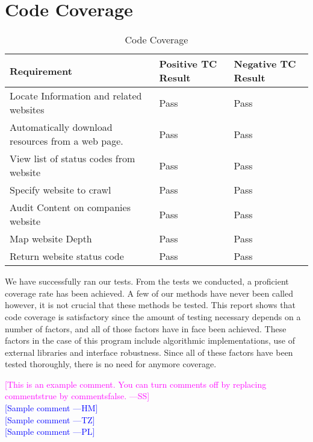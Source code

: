 \documentclass[12pt, titlepage]{article}
\newcommand{\authornote}[3]{\textcolor{#1}{[#3 ---#2]}}
\newcommand{\authornote}[3]{}
\newcommand{\wss}[1]{\authornote{magenta}{SS}{#1}}
\newcommand{\hm}[1]{\authornote{blue}{HM}{#1}} %
\newcommand{\tz}[1]{\authornote{blue}{TZ}{#1}} %
\newcommand{\pl}[1]{\authornote{blue}{PL}{#1}} %
\begin{document}
\section{Code Coverage}
\begin{table}[h!]
\centering
\begin{tabular}{| p{5cm} | p{5cm} | p{4cm} |}    \hline
Requirement & Positive TC Result &Negative TC Result \\ \hline
Locate Information and related websites& Pass & Pass\\ \hline
Automatically download resources from a web page.&Pass & Pass\\ \hline
View list of status codes from website&Pass & Pass\\ \hline
Specify website to crawl&Pass & Pass\\ \hline
Audit Content on companies website&Pass & Pass\\ \hline
Map website Depth&Pass & Pass\\ \hline
Return website status code&Pass & Pass\\ \hline

\end{tabular}
\caption{Code Coverage}
\label{table:Code Coverage}
\end{table}

We have successfully ran our tests. From the tests we conducted, a  proficient coverage rate has been achieved. A few of our methods have never been called however, it is not crucial that these methods be tested. This report shows that code coverage is satisfactory since the amount of testing necessary depends on a number of factors, and all of those factors have in face been achieved. These factors in the case of this program include algorithmic implementations, use of external libraries and interface robustness. Since all of these factors have been tested thoroughly, there is no need for anymore coverage.




\noindent \wss{This is an example comment.  You can turn comments off by replacing
  commentstrue by commentsfalse.}\\
\hm{Sample comment}\\
\tz{Sample comment}\\
\pl{Sample comment}
\end{document}
